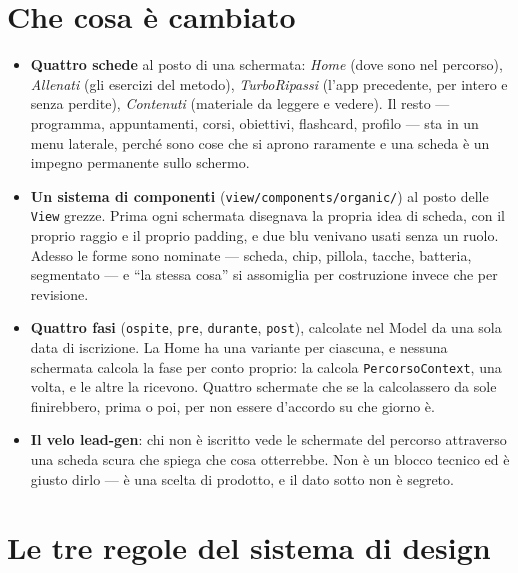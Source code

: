 \documentclass[11pt,a4paper]{report}
\begin{document}
\section{Che cosa \`e cambiato}

\begin{itemize}[nosep]
  \item \textbf{Quattro schede} al posto di una schermata: \emph{Home}
        (dove sono nel percorso), \emph{Allenati} (gli esercizi del metodo),
        \emph{TurboRipassi} (l'app precedente, per intero e senza perdite),
        \emph{Contenuti} (materiale da leggere e vedere). Il resto --- programma,
        appuntamenti, corsi, obiettivi, flashcard, profilo --- sta in un menu
        laterale, perch\'e sono cose che si aprono raramente e una scheda
        \`e un impegno permanente sullo schermo.
  \item \textbf{Un sistema di componenti} (\texttt{view/components/organic/})
        al posto delle \texttt{View} grezze. Prima ogni schermata disegnava la
        propria idea di scheda, con il proprio raggio e il proprio padding, e
        due blu venivano usati senza un ruolo. Adesso le forme sono nominate
        --- scheda, chip, pillola, tacche, batteria, segmentato --- e ``la
        stessa cosa'' si assomiglia per costruzione invece che per revisione.
  \item \textbf{Quattro fasi} (\texttt{ospite}, \texttt{pre}, \texttt{durante},
        \texttt{post}), calcolate nel Model da una sola data di iscrizione.
        La Home ha una variante per ciascuna, e nessuna schermata calcola la
        fase per conto proprio: la calcola \texttt{PercorsoContext}, una volta,
        e le altre la ricevono. Quattro schermate che se la calcolassero da
        sole finirebbero, prima o poi, per non essere d'accordo su che giorno
        \`e.
  \item \textbf{Il velo lead-gen}: chi non \`e iscritto vede le schermate del
        percorso attraverso una scheda scura che spiega che cosa otterrebbe.
        Non \`e un blocco tecnico ed \`e giusto dirlo --- \`e una scelta di
        prodotto, e il dato sotto non \`e segreto.
\end{itemize}

\section{Le tre regole del sistema di design}
\end{document}

